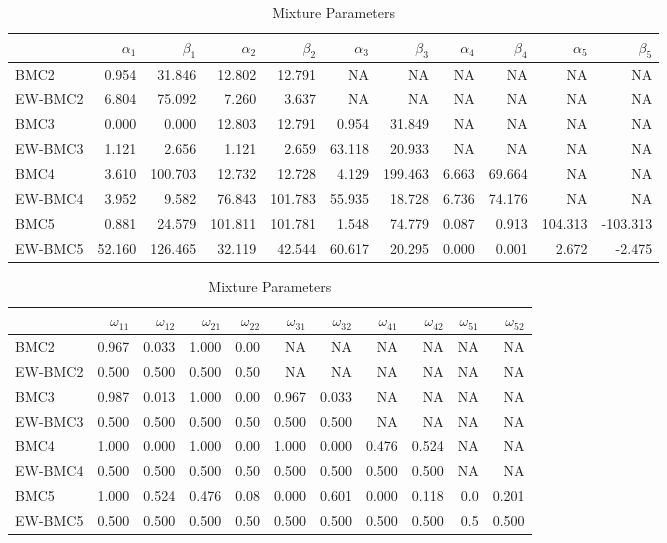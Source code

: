 \documentclass[
]{article}
\begin{document}
\begin{table}[H]

\caption{\label{tab:unnamed-chunk-18}Mixture Parameters}
\centering
\fontsize{8}{10}\selectfont
\begin{tabular}[t]{lrrrrrrrrrr}
\toprule
  & $\alpha_1$ & $\beta_1$ & $\alpha_2$ & $\beta_2$ & $\alpha_3$ & $\beta_3$ & $\alpha_4$ & $\beta_4$ & $\alpha_5$ & $\beta_5$\\
\midrule
BMC2 & 0.954 & 31.846 & 12.802 & 12.791 & NA & NA & NA & NA & NA & NA\\
EW-BMC2 & 6.804 & 75.092 & 7.260 & 3.637 & NA & NA & NA & NA & NA & NA\\
BMC3 & 0.000 & 0.000 & 12.803 & 12.791 & 0.954 & 31.849 & NA & NA & NA & NA\\
EW-BMC3 & 1.121 & 2.656 & 1.121 & 2.659 & 63.118 & 20.933 & NA & NA & NA & NA\\
BMC4 & 3.610 & 100.703 & 12.732 & 12.728 & 4.129 & 199.463 & 6.663 & 69.664 & NA & NA\\
\addlinespace
EW-BMC4 & 3.952 & 9.582 & 76.843 & 101.783 & 55.935 & 18.728 & 6.736 & 74.176 & NA & NA\\
BMC5 & 0.881 & 24.579 & 101.811 & 101.781 & 1.548 & 74.779 & 0.087 & 0.913 & 104.313 & -103.313\\
EW-BMC5 & 52.160 & 126.465 & 32.119 & 42.544 & 60.617 & 20.295 & 0.000 & 0.001 & 2.672 & -2.475\\
\bottomrule
\end{tabular}
\end{table}

\begin{table}[H]

\caption{\label{tab:unnamed-chunk-18}Mixture Parameters}
\centering
\fontsize{8}{10}\selectfont
\begin{tabular}[t]{lrrrrrrrrrr}
\toprule
  & $\omega_{11}$ & $\omega_{12}$ & $\omega_{21}$ & $\omega_{22}$ & $\omega_{31}$ & $\omega_{32}$ & $\omega_{41}$ & $\omega_{42}$ & $\omega_{51}$ & $\omega_{52}$\\
\midrule
BMC2 & 0.967 & 0.033 & 1.000 & 0.00 & NA & NA & NA & NA & NA & NA\\
EW-BMC2 & 0.500 & 0.500 & 0.500 & 0.50 & NA & NA & NA & NA & NA & NA\\
BMC3 & 0.987 & 0.013 & 1.000 & 0.00 & 0.967 & 0.033 & NA & NA & NA & NA\\
EW-BMC3 & 0.500 & 0.500 & 0.500 & 0.50 & 0.500 & 0.500 & NA & NA & NA & NA\\
BMC4 & 1.000 & 0.000 & 1.000 & 0.00 & 1.000 & 0.000 & 0.476 & 0.524 & NA & NA\\
\addlinespace
EW-BMC4 & 0.500 & 0.500 & 0.500 & 0.50 & 0.500 & 0.500 & 0.500 & 0.500 & NA & NA\\
BMC5 & 1.000 & 0.524 & 0.476 & 0.08 & 0.000 & 0.601 & 0.000 & 0.118 & 0.0 & 0.201\\
EW-BMC5 & 0.500 & 0.500 & 0.500 & 0.50 & 0.500 & 0.500 & 0.500 & 0.500 & 0.5 & 0.500\\
\bottomrule
\end{tabular}
\end{table}
\end{document}

